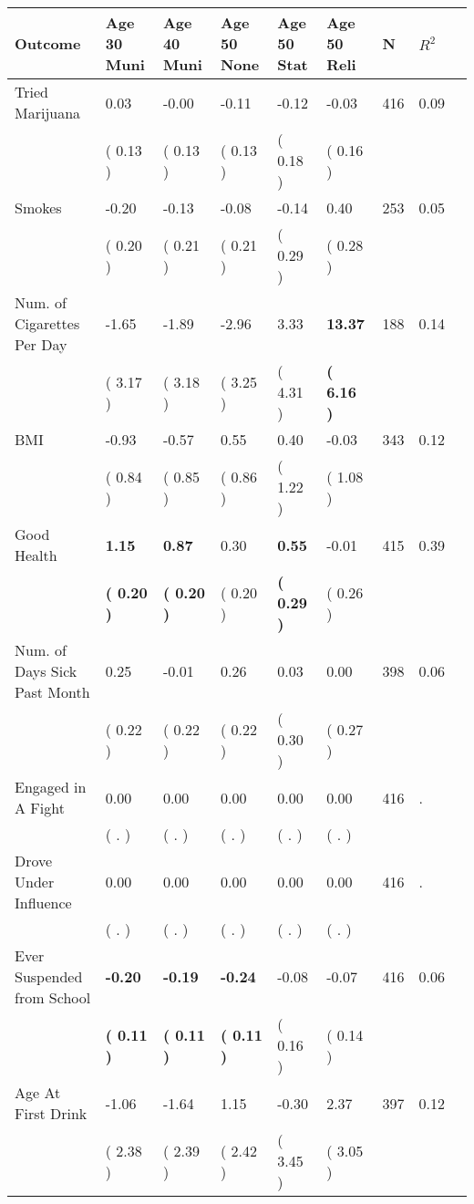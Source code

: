 \begin{tabular}{L{6.2cm} C{1.8cm} C{1.8cm} C{1.8cm} C{1.8cm} C{1.8cm} C{1.8cm} C{0.3cm} C{0.3cm}}
\toprule
 \textbf{Outcome} & \textbf{Age 30 Muni} & \textbf{Age 40 Muni} & \textbf{Age 50 None} & \textbf{Age 50 Stat} & \textbf{Age 50 Reli} & \textbf{N} & \textbf{$ R^2$} \\
\midrule
Tried Marijuana &      0.03 &     -0.00 &     -0.11 &     -0.12 &     -0.03  & 416 &       0.09 \\ 
 & (     0.13 ) & (     0.13 ) & (     0.13 ) & (     0.18 ) & (     0.16 )  & \\
Smokes &     -0.20 &     -0.13 &     -0.08 &     -0.14 &      0.40  & 253 &       0.05 \\ 
 & (     0.20 ) & (     0.21 ) & (     0.21 ) & (     0.29 ) & (     0.28 )  & \\
Num. of Cigarettes Per Day &     -1.65 &     -1.89 &     -2.96 &      3.33 & \textbf{    13.37}  & 188 &       0.14 \\ 
 & (     3.17 ) & (     3.18 ) & (     3.25 ) & (     4.31 ) & \textbf{(     6.16 )}  & \\
BMI &     -0.93 &     -0.57 &      0.55 &      0.40 &     -0.03  & 343 &       0.12 \\ 
 & (     0.84 ) & (     0.85 ) & (     0.86 ) & (     1.22 ) & (     1.08 )  & \\
Good Health & \textbf{     1.15} & \textbf{     0.87} &      0.30 & \textbf{     0.55} &     -0.01  & 415 &       0.39 \\ 
 & \textbf{(     0.20 )} & \textbf{(     0.20 )} & (     0.20 ) & \textbf{(     0.29 )} & (     0.26 )  & \\
Num. of Days Sick Past Month &      0.25 &     -0.01 &      0.26 &      0.03 &      0.00  & 398 &       0.06 \\ 
 & (     0.22 ) & (     0.22 ) & (     0.22 ) & (     0.30 ) & (     0.27 )  & \\
Engaged in A Fight &      0.00 &      0.00 &      0.00 &      0.00 &      0.00  & 416 &          . \\ 
 & (        . ) & (        . ) & (        . ) & (        . ) & (        . )  & \\
Drove Under Influence &      0.00 &      0.00 &      0.00 &      0.00 &      0.00  & 416 &          . \\ 
 & (        . ) & (        . ) & (        . ) & (        . ) & (        . )  & \\
Ever Suspended from School & \textbf{    -0.20} & \textbf{    -0.19} & \textbf{    -0.24} &     -0.08 &     -0.07  & 416 &       0.06 \\ 
 & \textbf{(     0.11 )} & \textbf{(     0.11 )} & \textbf{(     0.11 )} & (     0.16 ) & (     0.14 )  & \\
Age At First Drink &     -1.06 &     -1.64 &      1.15 &     -0.30 &      2.37  & 397 &       0.12 \\ 
 & (     2.38 ) & (     2.39 ) & (     2.42 ) & (     3.45 ) & (     3.05 )  & \\
\bottomrule
\end{tabular}
